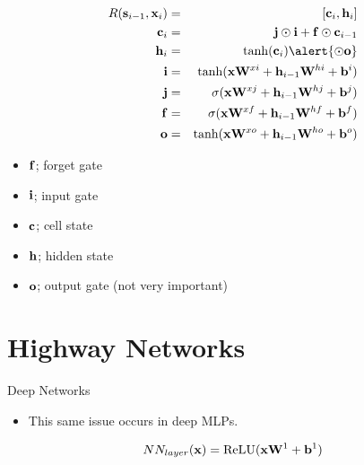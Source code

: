 \documentclass{beamer}
\begin{document}
\begin{frame}
  \begin{eqnarray*}
    R(\bold \bolds_{i-1}, \boldx_i) &=& [\boldc_i, \boldh_i]  \\
    \boldc_i &=& \boldj \odot \boldi  + \bold f \odot \bold c_{i-1}    \\
    \boldh_i &=& \tanh(\boldc_i) \alert{\odot \boldo}\\ 
    \boldi &=& \tanh(\boldx \boldW^{xi} + \boldh_{i-1}\boldW^{hi} + \boldb^i) \\
    \boldj &=& \sigma(\boldx \boldW^{xj} + \boldh_{i-1}\boldW^{hj} + \boldb^j) \\
    \boldf &=& \sigma(\boldx \boldW^{xf} + \boldh_{i-1}\boldW^{hf} + \boldb^f) \\
    \boldo &=& \tanh(\boldx \boldW^{xo} + \boldh_{i-1}\boldW^{ho} + \boldb^o) \\
  \end{eqnarray*}
  \begin{itemize}
  \item $\mathbf{f}$; forget gate
  \item $\mathbf{i}$; input gate
  \item $\mathbf{c}$; cell state
  \item $\mathbf{h}$; hidden state
  \item $\mathbf{o}$; output gate (not very important)
  \end{itemize}
\end{frame}

\begin{frame}
  
\end{frame}

\section{Highway Networks}

\begin{frame}{Deep Networks}
  \begin{itemize}
  \item This same issue occurs in deep MLPs.
  \end{itemize}
  \[NN_{layer}(\boldx) = \relu(\boldx \boldW^1 + \boldb^1)  \]
      \begin{center}
    \end{center}
\end{frame}
\end{document}
